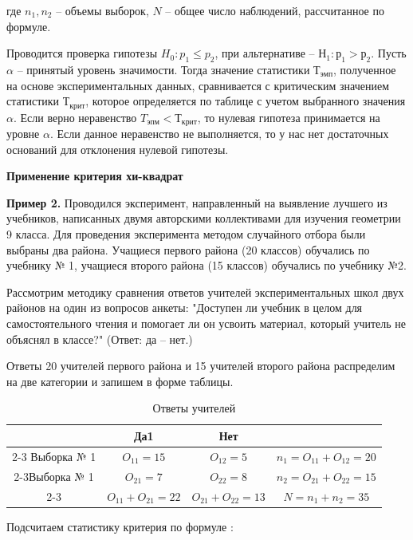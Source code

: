 \documentclass[12pt]{article}
\begin{document}
где $n_1, n_2$ – объемы выборок, $N$ – общее число наблюдений, рассчитанное по формуле.

Проводится проверка гипотезы $H_0: p_1 \leq p_2$, при альтернативе – $Н_1: р_1 > р_2$. Пусть $\alpha$ – принятый уровень значимости. Тогда значение статистики $Т_{эмп}$, полученное на основе экспериментальных данных, сравнивается с критическим значением статистики $Т_{крит}$, которое определяется по таблице  с учетом выбранного значения $\alpha$. Если верно неравенство $T_{эпм}<Т_{крит}$, то нулевая гипотеза принимается на уровне $\alpha$. Если данное неравенство не выполняется, то у нас нет достаточных оснований для отклонения нулевой гипотезы.

\medskip
\textbf{Применение критерия хи-квадрат}

\medskip
\textbf{Пример 2.} Проводился эксперимент, направленный на выявление лучшего из учебников, написанных двумя авторскими коллективами для изучения геометрии 9 класса. Для проведения эксперимента методом случайного отбора были выбраны два района. Учащиеся первого района (20 классов) обучались по учебнику № 1, учащиеся второго района (15 классов) обучались по учебнику №2.

Рассмотрим методику сравнения ответов учителей экспериментальных школ двух районов на один из вопросов анкеты: "Доступен ли учебник в целом для самостоятельного чтения и помогает ли он усвоить материал, который учитель не объяснял в классе?" (Ответ: да – нет.)

Ответы 20 учителей первого района и 15 учителей второго района распределим на две категории и запишем в форме таблицы.

\begin{table}[h]
    \centering
    \caption{Ответы учителей}
    \bigskip
    \begin{tabular}{c|c|c|c} 
         &Да1&Нет&  \\
         \cline{2-3} Выборка № 1&\textit{$O_{11} = 15$}&\textit{$O_{12} = 5$}&\textit{$n_1 = O_{11} + O_{12} = 20$} \\
         \cline{2-3}Выборка № 1&\textit{$O_{21} = 7$}&\textit{$O_{22} = 8$}&\textit{$n_2 = O_{21} + O_{22} = 15$} \\
         \cline{2-3}&\textit{$O_{11} + O_{21} = 22$}&\textit{$O_{21} + O_{22} = 13$}&\textit{$N = n_1 + n_2 = 35$}  \\
    \end{tabular}
\end{table}

Подсчитаем статистику критерия по формуле :
\end{document}
